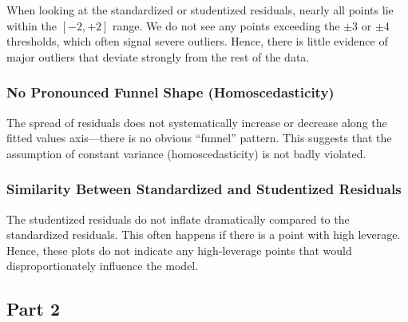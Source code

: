 \documentclass[
]{article}
\begin{document}
When looking at the standardized or studentized residuals, nearly all
points lie within the \([-2, +2]\) range. We do not see any points
exceeding the \(\pm3\) or \(\pm4\) thresholds, which often signal severe
outliers. Hence, there is little evidence of major outliers that deviate
strongly from the rest of the data.

\subsubsection{No Pronounced Funnel Shape
(Homoscedasticity)}\label{no-pronounced-funnel-shape-homoscedasticity}

The spread of residuals does not systematically increase or decrease
along the fitted values axis---there is no obvious ``funnel'' pattern.
This suggests that the assumption of constant variance
(homoscedasticity) is not badly violated.

\subsubsection{Similarity Between Standardized and Studentized
Residuals}\label{similarity-between-standardized-and-studentized-residuals}

The studentized residuals do not inflate dramatically compared to the
standardized residuals. This often happens if there is a point with high
leverage. Hence, these plots do not indicate any high‐leverage points
that would disproportionately influence the model.

\subsection{Part 2}\label{part-2-1}
\end{document}
